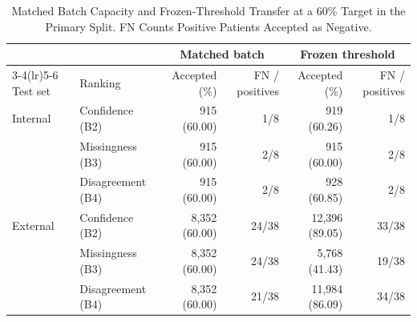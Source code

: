 \documentclass[conference]{IEEEtran}
\begin{document}
\begin{table}[t]
\caption{Matched Batch Capacity and Frozen-Threshold Transfer at a 60\% Target in the Primary Split. FN Counts Positive Patients Accepted as Negative.}
\label{tab:transfer}
\centering
\footnotesize
\begin{tabular}{llrrrr}
\toprule
 & & \multicolumn{2}{c}{Matched batch} & \multicolumn{2}{c}{Frozen threshold}\\
\cmidrule(lr){3-4}\cmidrule(lr){5-6}
Test set & Ranking & Accepted (\%) & FN / positives & Accepted (\%) & FN / positives\\
\midrule
Internal & Confidence (B2) & 915 (60.00) & 1/8 & 919 (60.26) & 1/8\\
 & Missingness (B3) & 915 (60.00) & 2/8 & 915 (60.00) & 2/8\\
 & Disagreement (B4) & 915 (60.00) & 2/8 & 928 (60.85) & 2/8\\
\addlinespace
External & Confidence (B2) & 8,352 (60.00) & 24/38 & 12,396 (89.05) & 33/38\\
 & Missingness (B3) & 8,352 (60.00) & 24/38 & 5,768 (41.43) & 19/38\\
 & Disagreement (B4) & 8,352 (60.00) & 21/38 & 11,984 (86.09) & 34/38\\
\bottomrule
\end{tabular}
\end{table}
\end{document}
